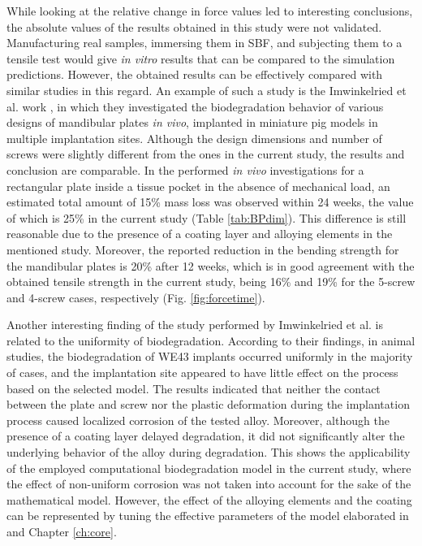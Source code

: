 While looking at the relative change in force values led to interesting conclusions, the absolute values of the results obtained in this study were not validated. Manufacturing real samples, immersing them in {SBF}, and subjecting them to a tensile test would give \textit{in vitro} results that can be compared to the simulation predictions. However, the obtained results can be effectively compared with similar studies in this regard. An example of such a study is the Imwinkelried et al. work \cite{Imwinkelried2020}, in which they investigated the biodegradation behavior of various designs of mandibular plates \textit{in vivo}, implanted in miniature pig models in multiple implantation sites. Although the design dimensions and number of screws were slightly different from the ones in the current study, the results and conclusion are comparable. In the performed \textit{in vivo} investigations for a rectangular plate inside a tissue pocket in the absence of mechanical load, an estimated total amount of 15\% mass loss was observed within 24 weeks, the value of which is 25\% in the current study (Table \ref{tab:BPdim}). This difference is still reasonable due to the presence of a coating layer and alloying elements in the mentioned study. Moreover, the reported reduction in the bending strength for the mandibular plates is 20\% after 12 weeks, which is in good agreement with the obtained tensile strength in the current study, being 16\% and 19\% for the 5-screw and 4-screw cases, respectively (Fig. \ref{fig:forcetime}).

Another interesting finding of the study performed by Imwinkelried et al. \cite{Imwinkelried2020} is related to the uniformity of biodegradation. According to their findings, in animal studies, the biodegradation of WE43 implants occurred uniformly in the majority of cases, and the implantation site appeared to have little effect on the process based on the selected model. The results indicated that neither the contact between the plate and screw nor the plastic deformation during the implantation process caused localized corrosion of the tested alloy. Moreover, although the presence of a coating layer delayed degradation, it did not significantly alter the underlying behavior of the alloy during degradation. This shows the applicability of the employed computational biodegradation model in the current study, where the effect of non-uniform corrosion was not taken into account for the sake of the mathematical model. However, the effect of the alloying elements and the coating can be represented by tuning the effective parameters of the model elaborated in \cite{Barzegari2021} and Chapter \ref{ch:core}.

